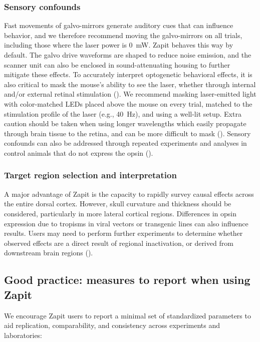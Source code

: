 \subsubsection{Sensory confounds}
Fast movements of galvo-mirrors generate auditory cues that can influence behavior, and we therefore recommend moving the galvo-mirrors on all trials, including those where the laser power is 0~mW. 
Zapit behaves this way by default.
The galvo drive waveforms are shaped to reduce noise emission, and the scanner unit can also be enclosed in sound-attenuating housing to further mitigate these effects.
To accurately interpret optogenetic behavioral effects, it is also critical to mask the mouse's ability to see the laser, whether through internal and/or external retinal stimulation (\cite{Danskin2015OptogeneticsArtifact, Weiler2026ProtocolVivo}).
We recommend masking laser-emitted light with color-matched LEDs placed above the mouse on every trial, matched to the stimulation profile of the laser (e.g., 40~Hz), and using a well-lit setup.
Extra caution should be taken when using longer wavelengths which easily propagate through brain tissue to the retina, and can be more difficult to mask (\cite{Danskin2015OptogeneticsArtifact, Weiler2026ProtocolVivo}).
Sensory confounds can also be addressed through repeated experiments and analyses in control animals that do not express the opsin (\cite{Gauld2025AActions}).

\subsubsection{Target region selection and interpretation} 
A major advantage of Zapit is the capacity to rapidly survey causal effects across the entire dorsal cortex.
However, skull curvature and thickness should be considered, particularly in more lateral cortical regions.
Differences in opsin expression due to tropisms in viral vectors or transgenic lines can also influence results.
Users may need to perform further experiments to determine whether observed effects are a direct result of regional inactivation, or derived from downstream brain regions (\cite{Wolff2018TheManipulations, Allen2017ApplicationSignaling}).

\subsection{Good practice: measures to report when using Zapit}
We encourage Zapit users to report a minimal set of standardized parameters to aid replication, comparability, and consistency across experiments and laboratories:

